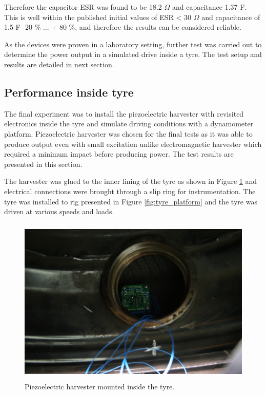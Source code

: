 Therefore the capacitor ESR was found to be 18.2 $\Omega$ and capacitance 1.37 F. This is well within the published initial values of ESR < 30 $\Omega$ and capacitance of 1.5 F -20 \% ... + 80 \%, and therefore the results can be considered reliable. 

As the devices were proven in a laboratory setting, further test was carried out to determine the power output in a simulated drive inside a tyre. The test setup and results are detailed in next section.

\subsection{Performance inside tyre}
The final experiment was to install the piezoelectric harvester with revisited electronics inside the tyre and simulate driving conditions with a dynamometer platform. Piezoelectric harvester was chosen for the final tests as it was able to produce output even with small excitation unlike electromagnetic harvester which required a minimum impact before producing power. The test results are presented in this section. 

The harvester was glued to the inner lining of the tyre as shown in Figure \ref{fig:harvester_potted} and electrical connections were brought through a slip ring for instrumentation. The tyre was installed to rig presented in Figure \ref{fig:tyre_platform} and the tyre was driven at various speeds and loads. 

\begin{figure}[htb]
\begin{center}
\includegraphics[height=8cm]{images/own_pic/tyre_fixture/piezo_bq_mount.jpg}
\end{center}
\caption{\label{fig:harvester_potted}Piezoelectric harvester mounted inside the tyre.}
\end{figure}

